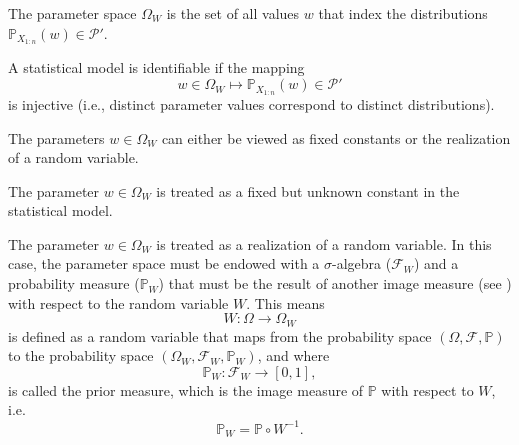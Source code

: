 \begin{definition}
	\label{def:parameter_space}
	The parameter space $\Omega_W$ is the set of all values $w$ that index the distributions $\mathbb{P}_{X_{1:n}}(w)\in \mathcal{P}'$.
\end{definition}

\begin{definition}
	A statistical model is identifiable if the mapping 
	\begin{equation}
		w \in \Omega_W \mapsto \mathbb{P}_{X_{1:n}}(w) \in \mathcal{P}'
	\end{equation}
	is injective (i.e., distinct parameter values correspond to distinct distributions).
\end{definition}

The parameters $w\in \Omega_W$ can either be viewed as fixed constants or the realization of a random variable.
\begin{axiom}
	\label{ax:parameter_fixed}
	The parameter $w\in \Omega_W$ is treated as a fixed but unknown constant in the statistical model.
\end{axiom}
\begin{axiom}
	\label{ax:parameter_variable}
	The parameter $w\in \Omega_W$ is treated as a realization of a random variable. In this case, the parameter space must be endowed with a $\sigma$-algebra ($\mathcal{F}_W$) and a probability measure ($\mathbb{P}_W$) that must be the result of another image measure (see  ) with respect to the random variable $W$. This means
	\begin{equation}
		W: \Omega \to \Omega_W
	\end{equation}
	is defined as a random variable that maps from the probability space $(\Omega, \mathcal{F}, \mathbb{P})$ to the probability space $(\Omega_W,\mathcal{F}_W,\mathbb{P}_W)$, and where
	\begin{equation}
		\mathbb{P}_W: \mathcal{F}_W \to [0,1],
	\end{equation}
	is called the prior measure, which is the image measure of $\mathbb{P}$ with respect to $W$, i.e.
	\begin{equation}
		\mathbb{P}_W = \mathbb{P}\circ W^{-1}.
	\end{equation}
\end{axiom}


